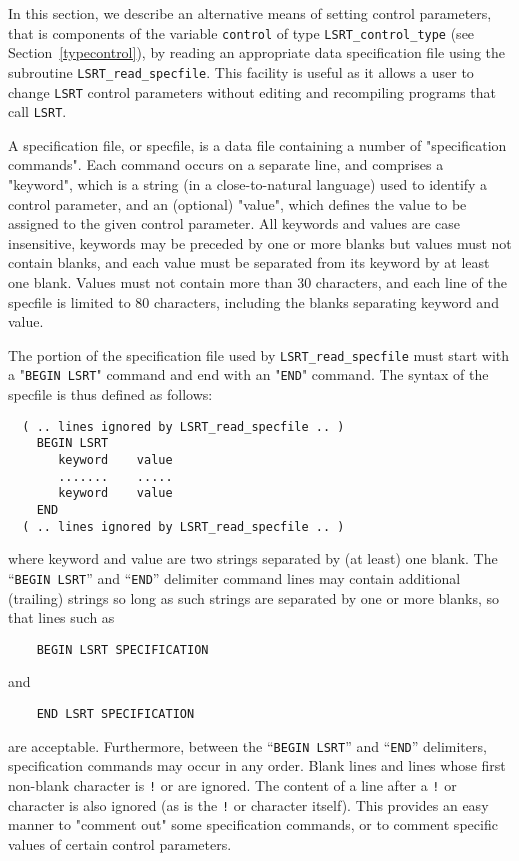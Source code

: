 \documentclass{galahad}
\newcommand{\packagename}{LS\-RT}
\begin{document}

\galfeatures
\noindent In this section, we describe an alternative means of setting
control parameters, that is components of the variable {\tt control} of type
{\tt \packagename\_control\_type}
(see Section~\ref{typecontrol}),
by reading an appropriate data specification file using the
subroutine {\tt \packagename\_read\_specfile}. This facility
is useful as it allows a user to change  {\tt \packagename} control parameters
without editing and recompiling programs that call {\tt \packagename}.

A specification file, or specfile, is a data file containing a number of
"specification commands". Each command occurs on a separate line,
and comprises a "keyword",
which is a string (in a close-to-natural language) used to identify a
control parameter, and
an (optional) "value", which defines the value to be assigned to the given
control parameter. All keywords and values are case insensitive,
keywords may be preceded by one or more blanks but
values must not contain blanks, and
each value must be separated from its keyword by at least one blank.
Values must not contain more than 30 characters, and
each line of the specfile is limited to 80 characters,
including the blanks separating keyword and value.

The portion of the specification file used by
{\tt \packagename\_read\_specfile}
must start
with a "{\tt BEGIN \packagename}" command and end with an
"{\tt END}" command.  The syntax of the specfile is thus defined as follows:
\begin{verbatim}
  ( .. lines ignored by LSRT_read_specfile .. )
    BEGIN LSRT
       keyword    value
       .......    .....
       keyword    value
    END
  ( .. lines ignored by LSRT_read_specfile .. )
\end{verbatim}
where keyword and value are two strings separated by (at least) one blank.
The ``{\tt BEGIN \packagename}'' and ``{\tt END}'' delimiter command lines
may contain additional (trailing) strings so long as such strings are
separated by one or more blanks, so that lines such as
\begin{verbatim}
    BEGIN LSRT SPECIFICATION
\end{verbatim}
and
\begin{verbatim}
    END LSRT SPECIFICATION
\end{verbatim}
are acceptable. Furthermore,
between the
``{\tt BEGIN \packagename}'' and ``{\tt END}'' delimiters,
specification commands may occur in any order.  Blank lines and
lines whose first non-blank character is {\tt !} or {\tt *} are ignored.
The content
of a line after a {\tt !} or {\tt *} character is also
ignored (as is the {\tt !} or {\tt *}
character itself). This provides an easy manner to "comment out" some
specification commands, or to comment specific values
of certain control parameters.
\end{document}
